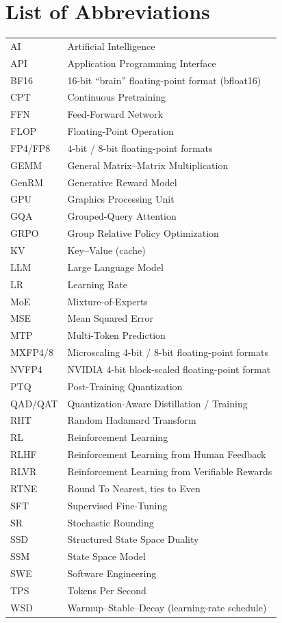 \chapter*{List of Abbreviations}

\begingroup
\singlespacing
\renewcommand{\arraystretch}{1.1}
\noindent
\begin{tabularx}{\linewidth}{@{}P{2.6cm}L@{}}
AI      & Artificial Intelligence \\
API     & Application Programming Interface \\
BF16    & 16-bit ``brain'' floating-point format (bfloat16) \\
CPT     & Continuous Pretraining \\
FFN     & Feed-Forward Network \\
FLOP    & Floating-Point Operation \\
FP4/FP8 & 4-bit / 8-bit floating-point formats \\
GEMM    & General Matrix--Matrix Multiplication \\
GenRM   & Generative Reward Model \\
GPU     & Graphics Processing Unit \\
GQA     & Grouped-Query Attention \\
GRPO    & Group Relative Policy Optimization \\
KV      & Key--Value (cache) \\
LLM     & Large Language Model \\
LR      & Learning Rate \\
MoE     & Mixture-of-Experts \\
MSE     & Mean Squared Error \\
MTP     & Multi-Token Prediction \\
MXFP4/8 & Microscaling 4-bit / 8-bit floating-point formats \\
NVFP4   & NVIDIA 4-bit block-scaled floating-point format \\
PTQ     & Post-Training Quantization \\
QAD/QAT & Quantization-Aware Distillation / Training \\
RHT     & Random Hadamard Transform \\
RL      & Reinforcement Learning \\
RLHF    & Reinforcement Learning from Human Feedback \\
RLVR    & Reinforcement Learning from Verifiable Rewards \\
RTNE    & Round To Nearest, ties to Even \\
SFT     & Supervised Fine-Tuning \\
SR      & Stochastic Rounding \\
SSD     & Structured State Space Duality \\
SSM     & State Space Model \\
SWE     & Software Engineering \\
TPS     & Tokens Per Second \\
WSD     & Warmup--Stable--Decay (learning-rate schedule) \\
\end{tabularx}
\endgroup
